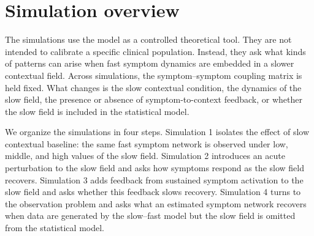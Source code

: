 


\section{Simulation overview}

The simulations use the model as a controlled theoretical tool. They are not
intended to calibrate a specific clinical population. Instead, they ask what
kinds of patterns can arise when fast symptom dynamics are embedded in a slower
contextual field. Across simulations, the symptom--symptom coupling matrix is
held fixed. What changes is the slow contextual condition, the dynamics of the
slow field, the presence or absence of symptom-to-context feedback, or whether
the slow field is included in the statistical model.

We organize the simulations in four steps. Simulation 1 isolates the effect of
slow contextual baseline: the same fast symptom network is observed under low,
middle, and high values of the slow field. Simulation 2 introduces an acute
perturbation to the slow field and asks how symptoms respond as the slow field
recovers. Simulation 3 adds feedback from sustained symptom activation to the
slow field and asks whether this feedback slows recovery. Simulation 4 turns to
the observation problem and asks what an estimated symptom network recovers when
data are generated by the slow--fast model but the slow field is omitted from
the statistical model.

